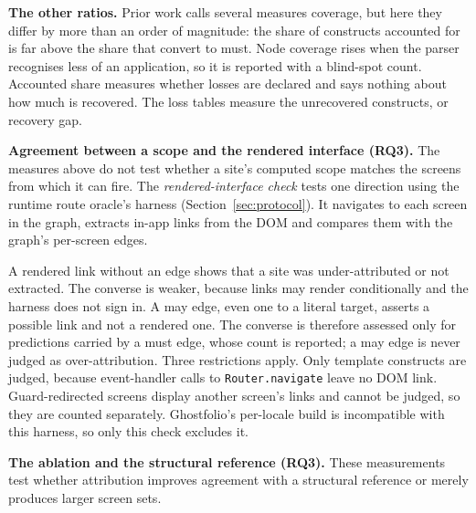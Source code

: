 \textbf{The other ratios.} Prior work calls several measures coverage, but here they differ by more than an order of
magnitude: the share of constructs accounted for is far above the share that convert to must. Node coverage rises when the parser recognises less of an
application, so it is reported with a blind-spot count. Accounted share measures whether losses are
declared and says nothing about how much is recovered. The loss tables measure the unrecovered
constructs, or recovery gap.

\textbf{Agreement between a scope and the rendered interface (RQ3).} The measures above do not test
whether a site's computed scope matches the screens from which it can fire. The
\emph{rendered-interface check} tests one direction using the runtime route oracle's harness
(Section~\ref{sec:protocol}). It navigates to each screen in the graph, extracts in-app links from
the DOM and compares them with the graph's per-screen edges.

A rendered link without an edge shows that a site was under-attributed or not extracted. The
converse is weaker, because links may render conditionally and the harness does not sign in. A may edge, even one to a literal target, asserts a possible link and not a rendered one. The
converse is therefore assessed only for predictions carried by a must edge, whose count is
reported; a may edge is never judged as over-attribution. Three restrictions apply. Only template
constructs are judged, because event-handler calls to \texttt{Router.navigate} leave no DOM link.
Guard-redirected screens display another screen's links and cannot be judged, so they are counted
separately. Ghostfolio's
per-locale build is incompatible with this harness, so only this check excludes it.

\textbf{The ablation and the structural reference (RQ3).} These measurements test whether attribution
improves agreement with a structural reference or merely produces larger screen sets.

